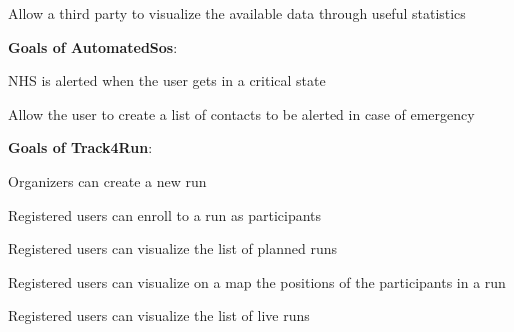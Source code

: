\begin{goalList}
\begin{enumerate}[label={[}G3.\arabic*{]}]
    \item \label{goal:parties5}Allow a third party to visualize the available data through useful statistics
    \newline
    
\end{enumerate}

\textbf{Goals of AutomatedSos}:
\begin{enumerate}[label={[}G4.\arabic*{]}]

\item \label{goal:sos1}NHS is alerted when the user gets in a critical state
\item \label{goal:sos2}Allow the user to create a list of contacts to be alerted  in case of emergency
    
\end{enumerate}
\newpage

\textbf{Goals of Track4Run}:
\begin{enumerate}[label={[}G5.\arabic*{]}]

    \item \label{goal:run1}Organizers can create a new run
    \item \label{goal:run2}Registered users can enroll to a run as participants
    \item \label{goal:run3}Registered users can visualize the list of planned runs
    \item \label{goal:run4}Registered users can visualize on a map the positions of the        participants in a run
    \item\label{goal:run5}Registered users can visualize the list of live runs
    
\end{enumerate}
\end{goalList}
